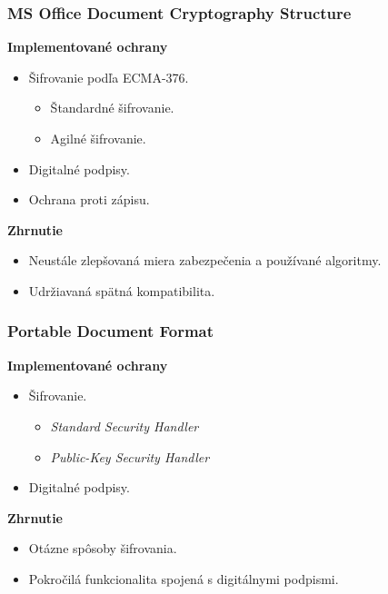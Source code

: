 \documentclass[xcolor=dvipsnames]{beamer}
\def\itemtitle#1{{\bfseries#1\smallskip}}
\begin{document}

\begin{frame}
	\frametitle{MS Office Document Cryptography Structure}
	\itemtitle{Implementované ochrany}
	\begin{itemize}
		\item Šifrovanie podľa ECMA-376.
		\begin{itemize}
			\item Štandardné šifrovanie.
			\item Agilné šifrovanie.
		\end{itemize}
		\item Digitalné podpisy.
		\item Ochrana proti zápisu.
	\end{itemize}
	\bigskip
	\itemtitle{Zhrnutie}
		\begin{itemize}
			\item Neustále zlepšovaná miera zabezpečenia a používané algoritmy.
			\item Udržiavaná spätná kompatibilita.
		\end{itemize}
\end{frame}


\begin{frame}
	\frametitle{Portable Document Format}
	\itemtitle{Implementované ochrany}
	\begin{itemize}
		\item Šifrovanie.
		\begin{itemize}
			\item \textit{Standard Security Handler}
			\item \textit{Public-Key Security Handler}	
		\end{itemize}
		\item Digitalné podpisy.
	\end{itemize}
	\bigskip
	\itemtitle{Zhrnutie}
	\begin{itemize}
		\item Otázne spôsoby šifrovania.  
		\item Pokročilá funkcionalita spojená s digitálnymi podpismi. 
	\end{itemize}
	

\end{frame}

\end{document}
